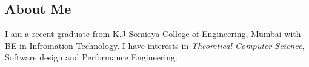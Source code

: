 \documentclass[12pt,a4paper,sans]{moderncv}
\begin{document}
 	\makecvtitle
 	\subsection{\hspace{10em} About Me} %
	I am a recent graduate from K.J Somiaya College of Engineering, Mumbai with BE in Infromation Technology. I have interests in \emph{Theoretical Computer Science}, Software design and Performance Engineering.  
	 
	 
	 
	 
	 

 
\end{document}
